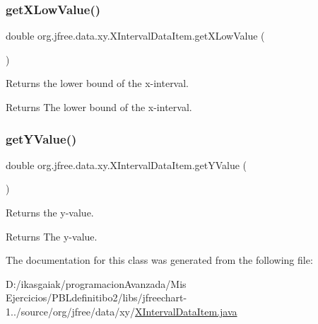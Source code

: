 \subsubsection{\texorpdfstring{get\+X\+Low\+Value()}{getXLowValue()}}
{\footnotesize\ttfamily double org.\+jfree.\+data.\+xy.\+X\+Interval\+Data\+Item.\+get\+X\+Low\+Value (\begin{DoxyParamCaption}{ }\end{DoxyParamCaption})}

Returns the lower bound of the x-\/interval.

\begin{DoxyReturn}{Returns}
The lower bound of the x-\/interval. 
\end{DoxyReturn}
\mbox{\label{classorg_1_1jfree_1_1data_1_1xy_1_1_x_interval_data_item_abd6406791563bc52fd58c8822b633f78}} 
\subsubsection{\texorpdfstring{get\+Y\+Value()}{getYValue()}}
{\footnotesize\ttfamily double org.\+jfree.\+data.\+xy.\+X\+Interval\+Data\+Item.\+get\+Y\+Value (\begin{DoxyParamCaption}{ }\end{DoxyParamCaption})}

Returns the y-\/value.

\begin{DoxyReturn}{Returns}
The y-\/value. 
\end{DoxyReturn}


The documentation for this class was generated from the following file\+:\begin{DoxyCompactItemize}
\item 
D\+:/ikasgaiak/programacion\+Avanzada/\+Mis Ejercicios/\+P\+B\+Ldefinitibo2/libs/jfreechart-\/1../source/org/jfree/data/xy/\mbox{\hyperlink{_x_interval_data_item_8java}{X\+Interval\+Data\+Item.\+java}}\end{DoxyCompactItemize}
